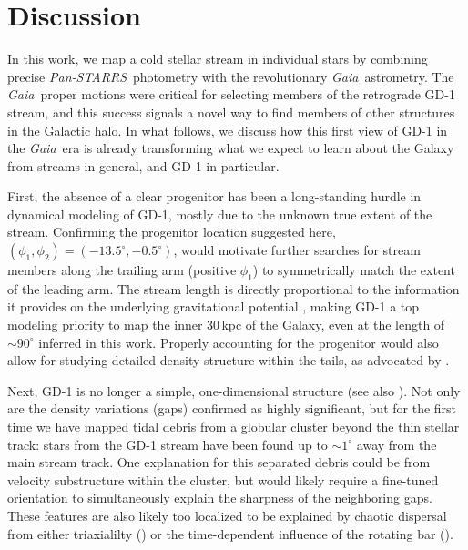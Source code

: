 \documentclass[modern]{aastex62}
\newcommand{\gaia}{\textsl{Gaia}}
\newcommand{\pans}{\textsl{Pan-STARRS}}
\newcommand{\kms}{\ensuremath{\textrm{km}~\textrm{s}^{-1}}}
\begin{document}
\section{Discussion}
\label{sec:discussion}

In this work, we map a cold stellar stream in individual stars by combining precise \pans\ photometry with the revolutionary \gaia\ astrometry.
The \gaia\ proper motions were critical for selecting members of the retrograde GD-1 stream, and this success signals a novel way to find members of other structures in the Galactic halo.
In what follows, we discuss how this first view of GD-1 in the \gaia\ era is already transforming what we expect to learn about the Galaxy from streams in general, and GD-1 in particular.

First, the absence of a clear progenitor has been a long-standing hurdle in dynamical modeling of GD-1, mostly due to the unknown true extent of the stream.
Confirming the progenitor location suggested here, $(\phi_1, \phi_2) =
(-13.5^\circ,-0.5^\circ)$, would motivate further searches for stream members
along the trailing arm (positive $\phi_1$) to symmetrically match the extent of
the leading arm.
The stream length is directly proportional to the information it provides on the underlying gravitational potential \citep{Bonaca:2018}, making GD-1 a top modeling priority to map the inner 30\,kpc of the Galaxy, even at the length of $\sim90^\circ$ inferred in this work.
Properly accounting for the progenitor would also allow for studying detailed density structure within the tails, as advocated by \citet{Kupper:2015}.

Next, GD-1 is no longer a simple, one-dimensional structure (see also \citealt{DeBoer:2018}).
Not only are the density variations (gaps) confirmed as highly significant, but for the first time we have mapped tidal debris from a globular cluster beyond the thin stellar track: stars from the GD-1 stream have been found up to $\sim1^\circ$ away from the main stream track.
One explanation for this separated debris could be from velocity substructure within the cluster, but would likely require a fine-tuned orientation to simultaneously explain the sharpness of the neighboring gaps.
These features are also likely too localized to be explained by chaotic
dispersal from either triaxialilty (\citealt{Price-Whelan:2016}) or the
time-dependent influence of the rotating bar (\citealt{Pearson:2017}).
\end{document}
